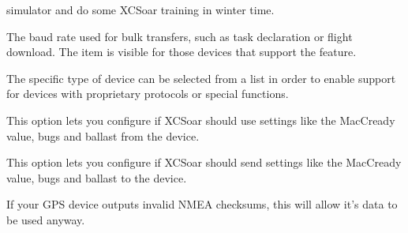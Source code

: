 \begin{description}
  simulator and do some XCSoar training in winter time.
\item[Bulk baud rate]  The baud rate used for bulk transfers, such 
  as task declaration or flight download. The item is visible for those 
  devices that support the feature.
\item[Driver]  The specific type of device can be selected from a list in order
  to enable support for devices with proprietary protocols or special
  functions.
\item[Sync.\ from device*]  This option lets you configure if XCSoar should use settings
  like the MacCready value, bugs and ballast from the device.
\item[Sync.\ to device*]  This option lets you configure if XCSoar should send settings
  like the MacCready value, bugs and ballast to the device.
\item[Ignore checksum*] If your GPS device outputs invalid NMEA checksums, this 
  will allow it's data to be used anyway.
\end{description}
